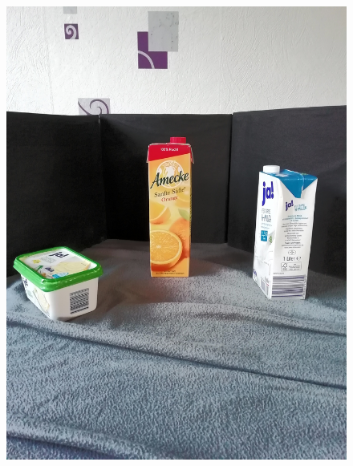 \documentclass[a4paper,12pt,oneside]{article}
\begin{document}
\begin{figure}[htb]
\begin{minipage}[c]{0.2\textwidth}
\includegraphics[width=\textwidth]{Sources/Bild2_HA.jpg}
\end{minipage}
\hfill
\begin{minipage}[c]{0.08\textwidth}

\end{minipage}
\end{figure}
\end{document}
